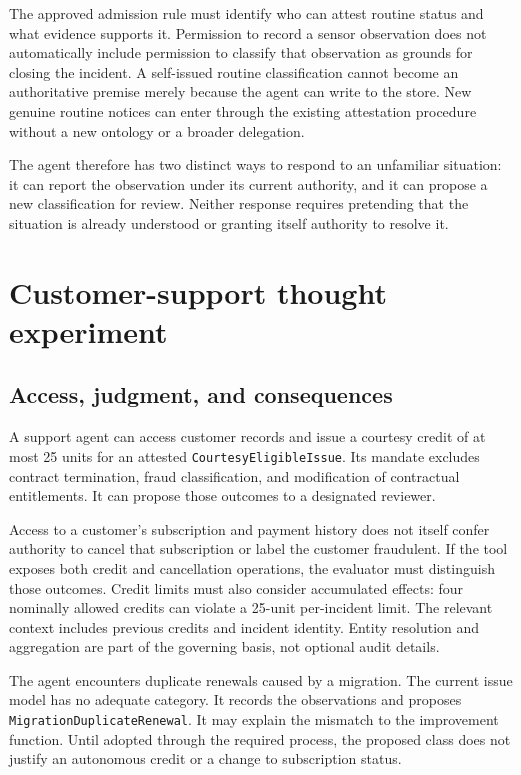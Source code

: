 \documentclass[
  english,
  12pt,
  a4paper,
  preprint,
  numbers,
  nopreprintline]{elsarticle}
\begin{document}
The approved admission rule must identify who can attest routine status
and what evidence supports it. Permission to record a sensor observation
does not automatically include permission to classify that observation
as grounds for closing the incident. A self-issued routine
classification cannot become an authoritative premise merely because the
agent can write to the store. New genuine routine notices can enter
through the existing attestation procedure without a new ontology or a
broader delegation.

The agent therefore has two distinct ways to respond to an unfamiliar
situation: it can report the observation under its current authority,
and it can propose a new classification for review. Neither response
requires pretending that the situation is already understood or granting
itself authority to resolve it.

\section{Customer-support thought
experiment}\label{customer-support-thought-experiment}

\subsection{Access, judgment, and
consequences}\label{access-judgment-and-consequences}

A support agent can access customer records and issue a courtesy credit
of at most 25 units for an attested \texttt{Courtesy\allowbreak{}Eligible\allowbreak{}Issue}. Its
mandate excludes contract termination, fraud classification, and
modification of contractual entitlements. It can propose those outcomes
to a designated reviewer.

Access to a customer's subscription and payment history does not itself
confer authority to cancel that subscription or label the customer
fraudulent. If the tool exposes both credit and cancellation operations,
the evaluator must distinguish those outcomes. Credit limits must also
consider accumulated effects: four nominally allowed credits can violate
a 25-unit per-incident limit. The relevant context includes previous
credits and incident identity. Entity resolution and aggregation are
part of the governing basis, not optional audit details.

The agent encounters duplicate renewals caused by a migration. The
current issue model has no adequate category. It records the
observations and proposes \texttt{Migration\allowbreak{}Duplicate\allowbreak{}Renewal}. It may
explain the mismatch to the improvement function. Until adopted through
the required process, the proposed class does not justify an autonomous
credit or a change to subscription status.
\end{document}
